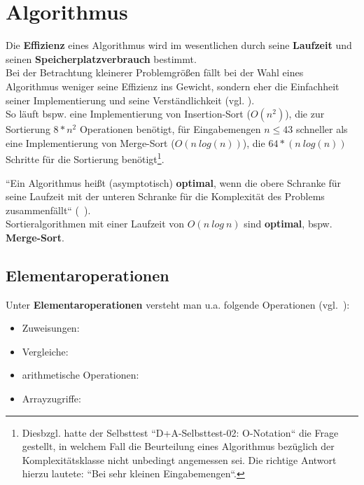 \section{Algorithmus}

Die \textbf{Effizienz} eines Algorithmus wird im wesentlichen durch seine \textbf{Laufzeit} und seinen \textbf{Speicherplatzverbrauch} bestimmt.\\



\noindent
Bei der Betrachtung kleinerer Problemgrößen fällt bei der Wahl eines Algorithmus weniger seine Effizienz ins Gewicht, sondern eher die Einfachheit seiner Implementierung und seine Verständlichkeit (vgl. \cite[5 f.]{GD18a}).\\
So läuft bspw. eine Implementierung von Insertion-Sort ($O(n^2)$), die zur Sortierung $8*n^2$ Operationen benötigt, für Eingabemengen $n \leq 43$ schneller als eine Implementierung von Merge-Sort ($O(n\ log(n))$), die $64 * (n\ log(n))$ Schritte für die Sortierung benötigt\footnote{
Diesbzgl. hatte der Selbsttest ``D+A-Selbsttest-02: O-Notation`` die Frage gestellt, in welchem Fall die Beurteilung eines Algorithmus bezüglich der Komplexitätsklasse nicht unbedingt angemessen sei. Die richtige Antwort hierzu lautete: ``Bei sehr kleinen Eingabemengen``.
}.\\

\begin{tcolorbox}[title={Optimaler Algorithmus}]
    ``Ein Algorithmus heißt (asymptotisch) \textbf{optimal}, wenn die obere Schranke für seine Laufzeit mit der unteren Schranke für die Komplexität des Problems zusammenfällt`` (~\cite[20]{GD18a}).\\

    \noindent
    Sortieralgorithmen mit einer Laufzeit von $O(n\ log\ n)$ sind \textbf{optimal}, bspw. \textbf{Merge-Sort}.
\end{tcolorbox}



\subsection{Elementaroperationen}

Unter \textbf{Elementaroperationen} versteht man u.a. folgende Operationen (vgl.~\cite[6]{GD18a}):

\begin{itemize}
    \item Zuweisungen: 
    \item Vergleiche: 
    \item arithmetische Operationen: 
    \item Arrayzugriffe: 
\end{itemize}

